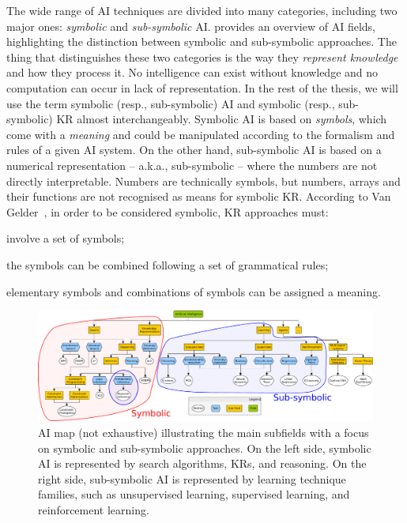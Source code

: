 The wide range of \gls{AI} techniques are divided into many categories, including two major ones: \emph{symbolic} and \emph{sub-symbolic} \gls{AI}.
%
 provides an overview of \gls{AI} fields, highlighting the distinction between symbolic and sub-symbolic approaches.
%
The thing that distinguishes these two categories is the way they \emph{represent knowledge} and how they process it.
%
No intelligence can exist without knowledge and no computation can occur in lack of representation.
%
In the rest of the thesis, we will use the term symbolic (resp., sub-symbolic) \gls{AI} and symbolic (resp., sub-symbolic) \gls{KR} almost interchangeably.
%
Symbolic \gls{AI} is based on \emph{symbols}, which come with a \emph{meaning} and could be manipulated according to the formalism and rules of a given \gls{AI} system.
%
On the other hand, sub-symbolic \gls{AI} is based on a numerical representation -- a.k.a., sub-symbolic -- where the numbers are not directly interpretable.
%
Numbers are technically symbols, but numbers, arrays and their functions are not recognised as means for symbolic \gls{KR}.
%
According to Van Gelder~\cite{DBLP:conf/ogai/Gelder90}, in order to be considered symbolic, \gls{KR} approaches must:
%
\begin{requirements}
    \item \label{itm:symbolic-req-1} involve a set of symbols;
    \item \label{itm:symbolic-req-2} the symbols can be combined following a set of grammatical rules;
    \item \label{itm:symbolic-req-3} elementary symbols and combinations of symbols can be assigned a meaning.
\end{requirements}
%
\begin{figure}
    \centering
    \includegraphics[width=\textwidth]{figures/ai-map2}
    \caption[Overview of the field of artificial intelligence]{
        \Gls{AI} map (not exhaustive) illustrating the main subfields with a focus on symbolic and sub-symbolic approaches.
        On the left side, symbolic \gls{AI} is represented by search algorithms, \glspl{KR}, and reasoning.
        On the right side, sub-symbolic \gls{AI} is represented by learning technique families, such as unsupervised learning, supervised learning, and reinforcement learning.
    }
    \label{fig:ai-map}
\end{figure}


